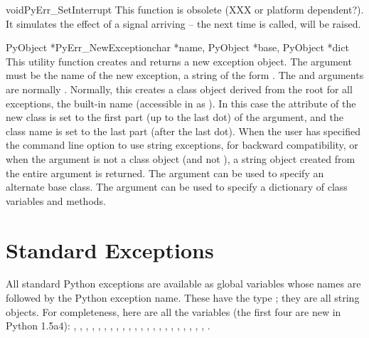 \documentclass[twoside,openright]{report}
\begin{document}
\begin{cfuncdesc}{void}{PyErr_SetInterrupt}{}
This function is obsolete (XXX or platform dependent?).  It simulates
the effect of a  signal arriving -- the next time
 is called,  will be
raised.
\end{cfuncdesc}

\begin{cfuncdesc}{PyObject *}{PyErr_NewException}{char *name,
PyObject *base, PyObject *dict}
This utility function creates and returns a new exception object.  The
 argument must be the name of the new exception, a \C{} string
of the form .  The  and 
arguments are normally \NULL{}.  Normally, this creates a class
object derived from the root for all exceptions, the built-in name
 (accessible in \C{} as ).  In this
case the  attribute of the new class is set to the
first part (up to the last dot) of the  argument, and the
class name is set to the last part (after the last dot).  When the
user has specified the  command line option to use string
exceptions, for backward compatibility, or when the 
argument is not a class object (and not \NULL{}), a string object
created from the entire  argument is returned.  The
 argument can be used to specify an alternate base class.
The  argument can be used to specify a dictionary of class
variables and methods.
\end{cfuncdesc}


\section{Standard Exceptions}

All standard Python exceptions are available as global variables whose
names are  followed by the Python exception name.
These have the type ; they are all string objects.
For completeness, here are all the variables (the first four are new
in Python 1.5a4):
,
,
,
,
,
,
,
,
,
,
,
,
,
,
,
,
,
,
,
,
,
,
.
\end{document}
